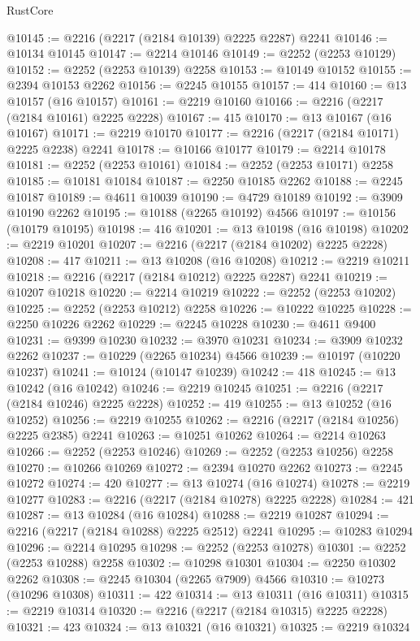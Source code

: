 \begin{lexlean}{RustCore}
\begin{coremodule}
@10145 := @2216 (@2217 (@2184 @10139) @2225 @2287) @2241
@10146 := @10134 @10145
@10147 := @2214 @10146
@10149 := @2252 (@2253 @10129)
@10152 := @2252 (@2253 @10139) @2258
@10153 := @10149 @10152
@10155 := @2394 @10153 @2262
@10156 := @2245 @10155
@10157 := 414
@10160 := @13 @10157 (@16 @10157)
@10161 := @2219 @10160
@10166 := @2216 (@2217 (@2184 @10161) @2225 @2228)
@10167 := 415
@10170 := @13 @10167 (@16 @10167)
@10171 := @2219 @10170
@10177 := @2216 (@2217 (@2184 @10171) @2225 @2238) @2241
@10178 := @10166 @10177
@10179 := @2214 @10178
@10181 := @2252 (@2253 @10161)
@10184 := @2252 (@2253 @10171) @2258
@10185 := @10181 @10184
@10187 := @2250 @10185 @2262
@10188 := @2245 @10187
@10189 := @4611 @10039
@10190 := @4729 @10189
@10192 := @3909 @10190 @2262
@10195 := @10188 (@2265 @10192) @4566
@10197 := @10156 (@10179 @10195)
@10198 := 416
@10201 := @13 @10198 (@16 @10198)
@10202 := @2219 @10201
@10207 := @2216 (@2217 (@2184 @10202) @2225 @2228)
@10208 := 417
@10211 := @13 @10208 (@16 @10208)
@10212 := @2219 @10211
@10218 := @2216 (@2217 (@2184 @10212) @2225 @2287) @2241
@10219 := @10207 @10218
@10220 := @2214 @10219
@10222 := @2252 (@2253 @10202)
@10225 := @2252 (@2253 @10212) @2258
@10226 := @10222 @10225
@10228 := @2250 @10226 @2262
@10229 := @2245 @10228
@10230 := @4611 @9400
@10231 := @9399 @10230
@10232 := @3970 @10231
@10234 := @3909 @10232 @2262
@10237 := @10229 (@2265 @10234) @4566
@10239 := @10197 (@10220 @10237)
@10241 := @10124 (@10147 @10239)
@10242 := 418
@10245 := @13 @10242 (@16 @10242)
@10246 := @2219 @10245
@10251 := @2216 (@2217 (@2184 @10246) @2225 @2228)
@10252 := 419
@10255 := @13 @10252 (@16 @10252)
@10256 := @2219 @10255
@10262 := @2216 (@2217 (@2184 @10256) @2225 @2385) @2241
@10263 := @10251 @10262
@10264 := @2214 @10263
@10266 := @2252 (@2253 @10246)
@10269 := @2252 (@2253 @10256) @2258
@10270 := @10266 @10269
@10272 := @2394 @10270 @2262
@10273 := @2245 @10272
@10274 := 420
@10277 := @13 @10274 (@16 @10274)
@10278 := @2219 @10277
@10283 := @2216 (@2217 (@2184 @10278) @2225 @2228)
@10284 := 421
@10287 := @13 @10284 (@16 @10284)
@10288 := @2219 @10287
@10294 := @2216 (@2217 (@2184 @10288) @2225 @2512) @2241
@10295 := @10283 @10294
@10296 := @2214 @10295
@10298 := @2252 (@2253 @10278)
@10301 := @2252 (@2253 @10288) @2258
@10302 := @10298 @10301
@10304 := @2250 @10302 @2262
@10308 := @2245 @10304 (@2265 @7909) @4566
@10310 := @10273 (@10296 @10308)
@10311 := 422
@10314 := @13 @10311 (@16 @10311)
@10315 := @2219 @10314
@10320 := @2216 (@2217 (@2184 @10315) @2225 @2228)
@10321 := 423
@10324 := @13 @10321 (@16 @10321)
@10325 := @2219 @10324

\end{coremodule}
\end{lexlean}
